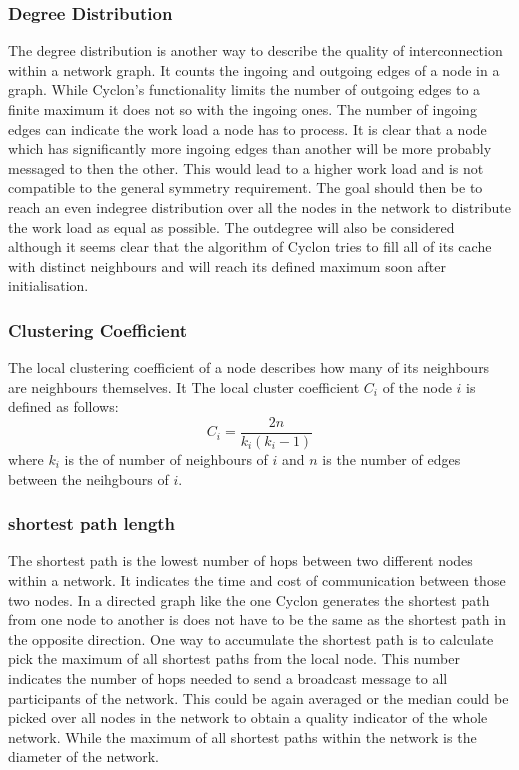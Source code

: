 \subsubsection{Degree Distribution}
The degree distribution is another way to describe the quality of
interconnection within a network graph. It counts the ingoing and outgoing edges
of a node in a graph. While Cyclon's functionality limits the number of outgoing
edges to a finite maximum it does not so with the ingoing ones. The number of
ingoing edges can indicate the work load a node has to process. It is clear that
a node which has significantly more ingoing edges than another will be more
probably messaged to then the other. This would lead to a higher work load and
is not compatible to the general symmetry requirement. The goal should then be
to reach an even indegree distribution over all the nodes in the network to
distribute the work load as equal as possible. The outdegree will also be
considered although it seems clear that the algorithm of Cyclon tries to fill
all of its cache with distinct neighbours and will reach its defined maximum
soon after initialisation.
\subsubsection{Clustering Coefficient}
The local clustering coefficient of a node describes how many of its neighbours
are neighbours themselves. It  The local cluster coefficient $C_i$ of the node
$i$ is defined as follows:
\[C_i = \frac{2n}{k_i(k_i-1)}\]
where $k_i$ is the of number of neighbours of $i$ and $n$ is the number of edges
between the neihgbours of $i$.

\subsubsection{shortest path length}
The shortest path is the lowest number of hops between two different nodes
within a network. It indicates the time and cost of communication between those
two nodes. In a directed graph like the one Cyclon generates the shortest path
from one node to another is does not have to be the same as the shortest path in
the opposite direction. One way to accumulate the shortest path is to calculate
pick the maximum of all shortest paths from the local node. This number
indicates the number of hops needed to send a broadcast message to all
participants of the network. This could be again averaged or the median could be
picked over all nodes in the network to obtain a quality indicator of the whole
network. While the maximum of all shortest paths within the network is the
diameter of the network.
